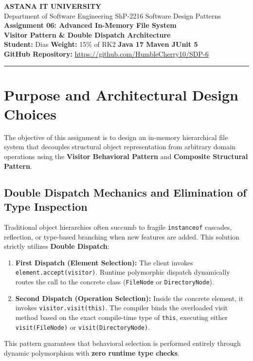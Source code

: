\documentclass[11pt,a4paper]{article}
\begin{document}
\begin{center}
    {\Large \textbf{ASTANA IT UNIVERSITY}}\\[0.2em]
    {\large Department of Software Engineering \textbar{} ShP-2216 Software Design Patterns}\\[0.4em]
    {\LARGE \textbf{Assignment 06: Advanced In-Memory File System}}\\[0.2em]
    {\large \textbf{Visitor Pattern \& Double Dispatch Architecture}}\\[0.5em]
    \textbf{Student:} Dias \quad \textbar{} \quad \textbf{Weight:} 15\% of RK2 \quad \textbar{} \quad \textbf{Java 17 \textbar{} Maven \textbar{} JUnit 5}\\[0.3em]
    \textbf{GitHub Repository:} \url{https://github.com/HumbleCherry10/SDP-6}
\end{center}

\vspace{-0.5em}
\hrule
\vspace{0.8em}

\section{Purpose and Architectural Design Choices}
The objective of this assignment is to design an in-memory hierarchical file system that decouples structural object representation from arbitrary domain operations using the \textbf{Visitor Behavioral Pattern} and \textbf{Composite Structural Pattern}.

\subsection{Double Dispatch Mechanics and Elimination of Type Inspection}
Traditional object hierarchies often succumb to fragile \texttt{instanceof} cascades, reflection, or type-based branching when new features are added. This solution strictly utilizes \textbf{Double Dispatch}:
\begin{enumerate}\itemsep 0pt
    \item \textbf{First Dispatch (Element Selection):} The client invokes \texttt{element.accept(visitor)}. Runtime polymorphic dispatch dynamically routes the call to the concrete class (\texttt{FileNode} or \texttt{DirectoryNode}).
    \item \textbf{Second Dispatch (Operation Selection):} Inside the concrete element, it invokes \texttt{visitor.visit(this)}. The compiler binds the overloaded visit method based on the exact compile-time type of \texttt{this}, executing either \texttt{visit(FileNode)} or \texttt{visit(DirectoryNode)}.
\end{enumerate}
This pattern guarantees that behavioral selection is performed entirely through dynamic polymorphism with \textbf{zero runtime type checks}.
\end{document}
